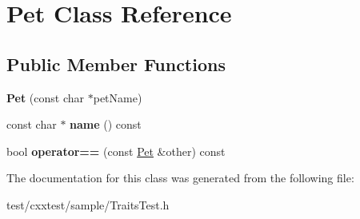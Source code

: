 \hypertarget{classPet}{\section{Pet Class Reference}
\label{classPet}
}
\subsection*{Public Member Functions}
\begin{DoxyCompactItemize}
\item 
\hypertarget{classPet_a3212657ee11846f1c9ec5fefd2425c10}{{\bfseries Pet} (const char $\ast$pet\-Name)}\label{classPet_a3212657ee11846f1c9ec5fefd2425c10}

\item 
\hypertarget{classPet_a6193e2aa8cd8cc2bc81ad628cc3c34b9}{const char $\ast$ {\bfseries name} () const }\label{classPet_a6193e2aa8cd8cc2bc81ad628cc3c34b9}

\item 
\hypertarget{classPet_ad3b0b57838ef23a421f4d5c1c5887b4d}{bool {\bfseries operator==} (const \hyperlink{classPet}{Pet} \&other) const }\label{classPet_ad3b0b57838ef23a421f4d5c1c5887b4d}

\end{DoxyCompactItemize}


The documentation for this class was generated from the following file\-:\begin{DoxyCompactItemize}
\item 
test/cxxtest/sample/Traits\-Test.\-h\end{DoxyCompactItemize}
